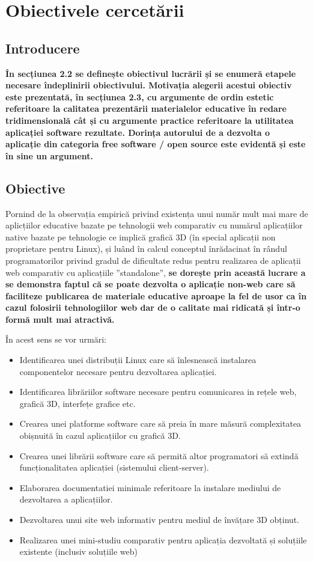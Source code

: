 \chapter{Obiectivele cercetării}
\section{Introducere}
\par \textbf{În secțiunea 2.2 se definește obiectivul lucrării și se enumeră etapele necesare îndeplinirii obiectivului. Motivația alegerii acestui obiectiv este prezentată, în secțiunea 2.3, cu argumente de ordin estetic referitoare la calitatea prezentării materialelor educative în redare tridimensională cât și cu argumente practice referitoare la utilitatea aplicației software rezultate. Dorința autorului de a dezvolta o aplicație din categoria free software / open source este evidentă și este în sine un argument.  }
\section{Obiective}
\par Pornind de la observația empirică privind existența unui număr mult mai mare de aplicțiilor educative bazate pe tehnologii web comparativ cu numărul aplicațiilor native bazate pe tehnologie ce implică grafică 3D (în special aplicații non proprietare pentru Linux), și luând în calcul conceptul înrădacinat în rândul programatorilor privind gradul de dificultate redus pentru realizarea de aplicații web comparativ cu aplicațiile ”standalone”, \textbf{ se dorește prin această lucrare a se demonstra faptul că se poate dezvolta o aplicație non-web care să faciliteze publicarea de materiale educative aproape la fel de usor ca în cazul folosirii tehnologiilor web dar de o calitate mai ridicată și într-o formă mult mai atractivă.}
\\
\par În acest sens se vor urmări:
\begin{itemize}
\item Identificarea unei distribuții Linux care să înlesnească instalarea componentelor necesare pentru dezvoltarea aplicației.
\item Identificarea librăriilor software necesare pentru comunicarea in rețele web, grafică 3D, interfețe grafice etc.
\item Crearea unei platforme software care să preia în mare măsură complexitatea obișnuită în cazul aplicațiilor cu grafică 3D.
\item Crearea unei librării software care să permită altor programatori să extindă funcționalitatea aplicației (sistemului client-server).
\item Elaborarea documentatiei minimale referitoare la instalare mediului de dezvoltarea a aplicațiilor.
\item Dezvoltarea unui site web informativ pentru mediul de învățare 3D obținut.
\item Realizarea unei mini-studiu comparativ pentru aplicația dezvoltată și soluțiile existente (inclusiv soluțiile web)
\end{itemize}


